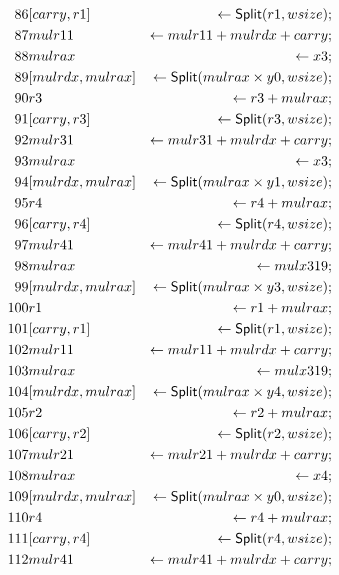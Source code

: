 \begin{align*}
86 & \concat{carry}{r1} & \leftarrow \dslcode{Split}(r1, wsize); \\
87 & mulr11 & \leftarrow mulr11 + mulrdx + carry; \\
88 & mulrax & \leftarrow x3; \\
89 & \concat{mulrdx}{mulrax} & \leftarrow \dslcode{Split}(mulrax \times y0, wsize); \\
90 & r3 & \leftarrow r3 + mulrax; \\
91 & \concat{carry}{r3} & \leftarrow \dslcode{Split}(r3, wsize); \\
92 & mulr31 & \leftarrow mulr31 + mulrdx + carry; \\
93 & mulrax & \leftarrow x3; \\
94 & \concat{mulrdx}{mulrax} & \leftarrow \dslcode{Split}(mulrax \times y1, wsize); \\
95 & r4 & \leftarrow r4 + mulrax; \\
96 & \concat{carry}{r4} & \leftarrow \dslcode{Split}(r4, wsize); \\
97 & mulr41 & \leftarrow mulr41 + mulrdx + carry; \\
98 & mulrax & \leftarrow mulx319; \\
99 & \concat{mulrdx}{mulrax} & \leftarrow \dslcode{Split}(mulrax \times y3, wsize); \\
100 & r1 & \leftarrow r1 + mulrax; \\
101 & \concat{carry}{r1} & \leftarrow \dslcode{Split}(r1, wsize); \\
102 & mulr11 & \leftarrow mulr11 + mulrdx + carry; \\
103 & mulrax & \leftarrow mulx319; \\
104 & \concat{mulrdx}{mulrax} & \leftarrow \dslcode{Split}(mulrax \times y4, wsize); \\
105 & r2 & \leftarrow r2 + mulrax; \\
106 & \concat{carry}{r2} & \leftarrow \dslcode{Split}(r2, wsize); \\
107 & mulr21 & \leftarrow mulr21 + mulrdx + carry; \\
108 & mulrax & \leftarrow x4; \\
109 & \concat{mulrdx}{mulrax} & \leftarrow \dslcode{Split}(mulrax \times y0, wsize); \\
110 & r4 & \leftarrow r4 + mulrax; \\
111 & \concat{carry}{r4} & \leftarrow \dslcode{Split}(r4, wsize); \\
112 & mulr41 & \leftarrow mulr41 + mulrdx + carry; \\

\end{align*}
